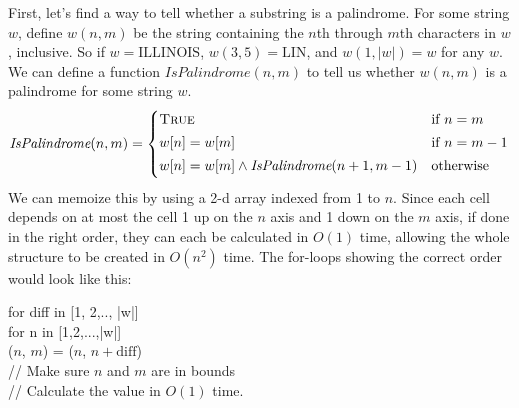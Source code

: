 \documentclass[11pt]{article}
\begin{document}
\begin{solution}
    First, let's find a way to tell whether a substring is a palindrome. For some string $w$, define $w(n, m)$ be the string containing the $n$th through $m$th characters in $w$, inclusive. So if $w = \text{ILLINOIS}$, $w(3, 5) = \text{LIN}$, and $w(1, |w|) = w$ for any $w$.
    We can define a function $IsPalindrome(n, m)$ to tell us whether $w(n, m)$ is a palindrome for some string $w$. 
\[
    \emph{IsPalindrome}(n,m) =
	\begin{cases}
		\textsc{True} & \text{if $n=m$}
\\[0.5ex]
                w[n] = w[m] & \text{if $n = m - 1$}
\\[0.5ex]
        w[n] = w[m] \wedge \emph{IsPalindrome}(n + 1, m - 1) & \text{otherwise}
\\[0.5ex]
	\end{cases}
\]
We can memoize this by using a 2-d array indexed from 1 to $n$. Since each cell depends on at most the cell 1 up on the $n$ axis and 1 down on the $m$ axis, if done in the right order, they can each be calculated in $O(1)$ time, allowing the whole structure to be created in $O(n^2)$ time. The for-loops showing the correct order would look like this:
\begin{algo}
    for diff in [1, 2,.., |w|] \+
    \\ for n in [1,2,...,|w|] \+
    \\ ($n$, $m$) = ($n$, $n + \text{diff}$)
    \\ // Make sure $n$ and $m$ are in bounds
    \\ // Calculate the value in $O(1)$ time.
\end{algo}


\end{solution}
\end{document}
